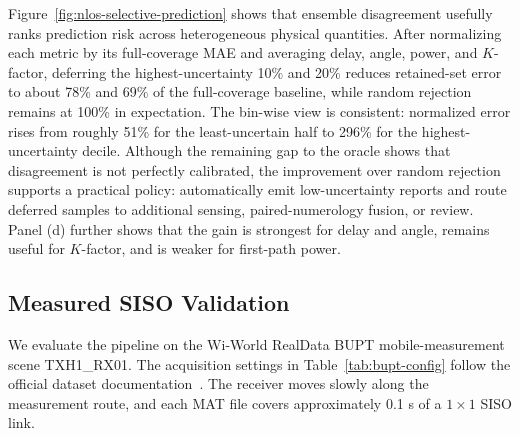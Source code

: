 Figure~\ref{fig:nlos-selective-prediction} shows that ensemble disagreement usefully ranks prediction
risk across heterogeneous physical quantities. After normalizing each metric by its full-coverage
MAE and averaging delay, angle, power, and \(K\)-factor, deferring the highest-uncertainty 10\% and
20\% reduces retained-set error to about 78\% and 69\% of the full-coverage baseline, while random
rejection remains at 100\% in expectation. The bin-wise view is consistent: normalized error rises
from roughly 51\% for the least-uncertain half to 296\% for the highest-uncertainty decile. Although
the remaining gap to the oracle shows that disagreement is not perfectly calibrated, the improvement
over random rejection supports a practical policy: automatically emit low-uncertainty reports and
route deferred samples to additional sensing, paired-numerology fusion, or review. Panel (d) further
shows that the gain is strongest for delay and angle, remains useful for \(K\)-factor, and is weaker
for first-path power.
\subsection{Measured SISO Validation}

We evaluate the pipeline on the Wi-World RealData BUPT mobile-measurement scene
TXH1\_RX01. The acquisition settings in Table~\ref{tab:bupt-config} follow the official dataset
documentation~\cite{wiworldrealdata}. The receiver moves slowly along the measurement route, and
each MAT file covers approximately 0.1 s of a \(1\times1\) SISO link.

